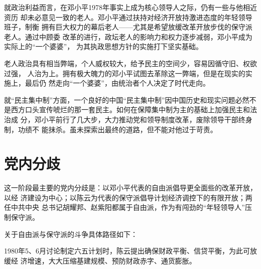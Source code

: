 就政治利益而言，在邓小平1978年事实上成为核心领导人之际，仍有一些与他相近资历
却未必意见一致的老人。邓小平通过扶持对经济开放持激进态度的年轻领导班子，制衡
拥有巨大权力的幕后老人——尤其是希望放缓改革开放步伐的保守派老人。通过中顾委
改革的进行，政坛老人的影响力和权力逐步减弱，邓小平成为实际上的“一个婆婆”，
为其执政思想方针的实施打下坚实基础。

老人政治具有相当弊端，个人威权较大，给予民主的空间少，容易因循守旧、权欲过强，
人治为上。拥有极大魄力的邓小平试图去革除这一弊端，但是在现实的实施上，最后仍
然走向“一个婆婆”，由统治者个人决定了时代走向。

就“民主集中制”方面，一个良好的中国“民主集中制”因中国历史和现实问题必然不
是西方口头宣传唬烂的那一套民主。如何在保障集中制为主的基础上加强民主和法治成
分，邓小平前行了几大步，大力推动党和领导制度改革，废除领导干部终身制，功绩不
能抹杀。虽未探索出最终的道路，但不能对他过于苛责。

\section{党内分歧}




这一阶段最主要的党内分歧是：以邓小平代表的自由派倡导更全面些的改革开放，以经
济建设为中心；以陈云为代表的保守派倡导计划经济调控下的有限开放；两任中共中央
总书记胡耀邦、赵紫阳都属于自由派，作为有闯劲的“年轻领导人”压制保守派。

关于自由派与保守派的斗争具体路径如下：

1980年5、6月讨论制定六五计划时，陈云提出确保财政平衡、信贷平衡，为此可放缓经
济增速，大大压缩基建规模、预防财政赤字、通货膨胀。

